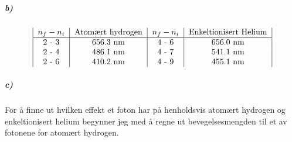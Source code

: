 \documentclass[11pt, A4paper,norsk]{article}
\begin{document}
			\subparagraph{b)}
				\begin{gather*}
\begin{tabular} { |c|c|c|c|}
$n_f - n_i$ & Atomært hydrogen & $n_f - n_i$ & Enkeltionisert Helium \\
\hline
2 - 3 & 656.3 nm & 4 - 6 & 656.0 nm \\
2 - 4 & 486.1 nm & 4 - 7 & 541.1 nm \\
2 - 6 & 410.2 nm & 4 - 9 & 455.1 nm
\end{tabular}
				\end{gather*}








			\subparagraph{c)}
				\begin{flushleft}
For å finne ut hvilken effekt et foton har på henholdsvis atomært hydrogen og enkeltionisert helium begynner jeg med å regne ut bevegelsesmengden til et av fotonene for atomært hydrogen.
				\end{flushleft}
\end{document}
